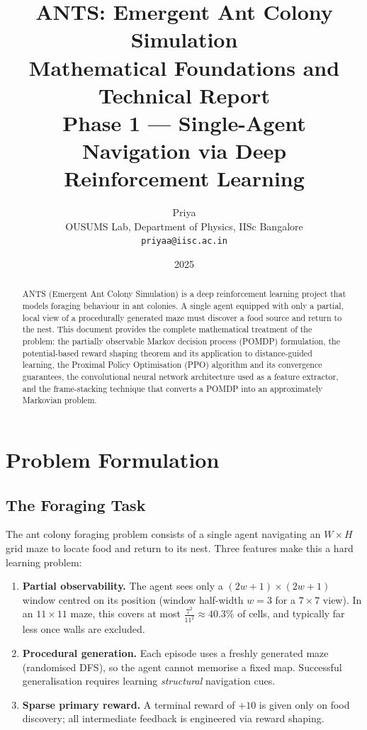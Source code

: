 \documentclass[11pt,a4paper]{article}
\title{%
  \textbf{ANTS: Emergent Ant Colony Simulation}\\[4pt]
  \large Mathematical Foundations and Technical Report\\[2pt]
  \normalsize Phase 1 --- Single-Agent Navigation via Deep Reinforcement Learning
}
\author{%
  Priya\\
  \small OUSUMS Lab, Department of Physics, IISc Bangalore\\
  \small \texttt{priyaa@iisc.ac.in}
}
\date{2025}
\begin{document}
\maketitle
\tableofcontents
\vspace{1em}

\begin{abstract}
ANTS (Emergent Ant Colony Simulation) is a deep reinforcement learning project that models
foraging behaviour in ant colonies.
A single agent equipped with only a partial, local view of a procedurally generated maze
must discover a food source and return to the nest.
This document provides the complete mathematical treatment of the problem:
the partially observable Markov decision process (POMDP) formulation,
the potential-based reward shaping theorem and its application to distance-guided learning,
the Proximal Policy Optimisation (PPO) algorithm and its convergence guarantees,
the convolutional neural network architecture used as a feature extractor,
and the frame-stacking technique that converts a POMDP into an approximately Markovian problem.
\end{abstract}

\section{Problem Formulation}

\subsection{The Foraging Task}

The ant colony foraging problem consists of a single agent navigating an
$W \times H$ grid maze to locate food and return to its nest.
Three features make this a hard learning problem:

\begin{enumerate}
  \item \textbf{Partial observability.} The agent sees only a $(2w{+}1)\times(2w{+}1)$
        window centred on its position (window half-width $w=3$ for a $7\times7$ view).
        In an $11\times11$ maze, this covers at most
        $\frac{7^2}{11^2} \approx 40.3\%$ of cells,
        and typically far less once walls are excluded.

  \item \textbf{Procedural generation.} Each episode uses a freshly generated maze
        (randomised DFS), so the agent cannot memorise a fixed map.
        Successful generalisation requires learning \emph{structural} navigation cues.

  \item \textbf{Sparse primary reward.} A terminal reward of $+10$ is given only on
        food discovery; all intermediate feedback is engineered via reward shaping.
\end{enumerate}
\end{document}
